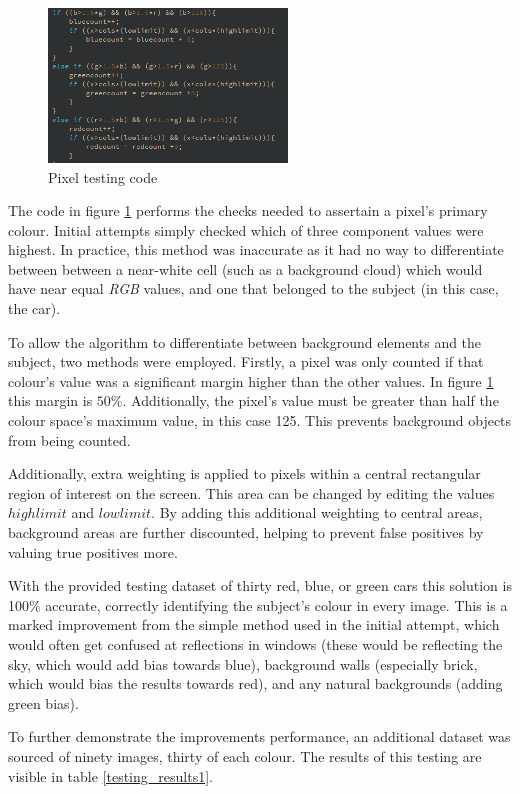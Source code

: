 \documentclass[conference]{IEEEtran}
\begin{document}
\begin{figure}[H]
\centering
\includegraphics[width=2.5in]{t1}
\caption{Pixel testing code}
\label{fig_t1code}
\end{figure}

The code in figure \ref{fig_t1code} performs the checks needed to assertain a pixel's primary colour. Initial attempts simply checked which of three component values were highest. In practice, this method was inaccurate as it had no way to differentiate between  between a near-white cell (such as a background cloud) which would have near equal \textit{RGB} values, and one that belonged to the subject (in this case, the car).

To allow the algorithm to differentiate between background elements and the subject, two methods were employed. Firstly, a pixel was only counted if that colour's value was a significant margin higher than the other values. In figure \ref{fig_t1code} this margin is $50\%$. Additionally, the pixel's value must be greater than half the colour space's maximum value, in this case 125. This prevents background objects from being counted.


Additionally, extra weighting is applied to pixels within a central rectangular region of interest on the screen. This area can be changed by editing the values $highlimit$ and $lowlimit$. By adding this additional weighting to central areas, background areas are further discounted, helping to prevent false positives by valuing true positives more.

With the provided testing dataset of thirty red, blue, or green cars this solution is 100$\%$ accurate, correctly identifying the subject's colour in every image. This is a marked improvement from the simple method used in the initial attempt, which would often get confused at reflections in windows (these would be reflecting the sky, which would add bias towards blue), background walls (especially brick, which would bias the results towards red), and any natural backgrounds (adding green bias).

To further demonstrate the improvements performance, an additional dataset was sourced of ninety images, thirty of each colour. The results of this testing are visible in table \ref{testing_results1}.
\end{document}
